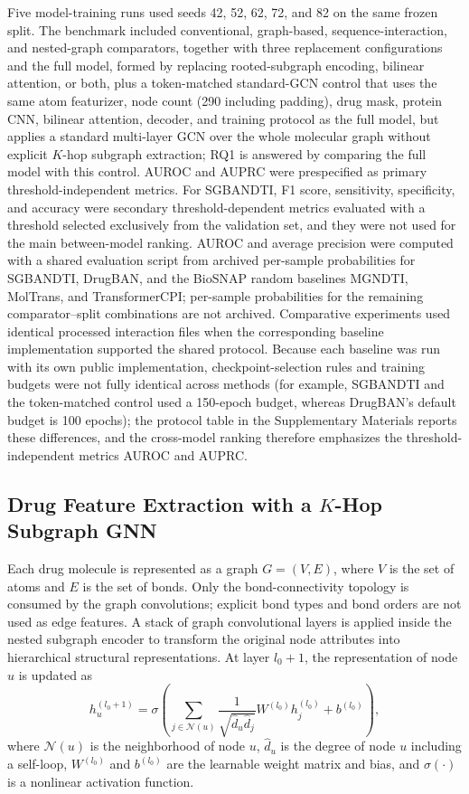 \documentclass[computers,article,submit,moreauthors]{Definitions/mdpi}
\begin{document}
Five model-training runs used seeds 42, 52, 62, 72, and 82 on the same frozen split. The benchmark included conventional, graph-based, sequence-interaction, and nested-graph comparators, together with three replacement configurations and the full model, formed by replacing rooted-subgraph encoding, bilinear attention, or both, plus a token-matched standard-GCN control that uses the same atom featurizer, node count (290 including padding), drug mask, protein CNN, bilinear attention, decoder, and training protocol as the full model, but applies a standard multi-layer GCN over the whole molecular graph without explicit $K$-hop subgraph extraction; RQ1 is answered by comparing the full model with this control. AUROC and AUPRC were prespecified as primary threshold-independent metrics. For SGBANDTI, F1 score, sensitivity, specificity, and accuracy were secondary threshold-dependent metrics evaluated with a threshold selected exclusively from the validation set, and they were not used for the main between-model ranking. AUROC and average precision were computed with a shared evaluation script from archived per-sample probabilities for SGBANDTI, DrugBAN, and the BioSNAP random baselines MGNDTI, MolTrans, and TransformerCPI; per-sample probabilities for the remaining comparator--split combinations are not archived. Comparative experiments used identical processed interaction files when the corresponding baseline implementation supported the shared protocol. Because each baseline was run with its own public implementation, checkpoint-selection rules and training budgets were not fully identical across methods (for example, SGBANDTI and the token-matched control used a 150-epoch budget, whereas DrugBAN's default budget is 100 epochs); the protocol table in the Supplementary Materials reports these differences, and the cross-model ranking therefore emphasizes the threshold-independent metrics AUROC and AUPRC.

\subsection{Drug Feature Extraction with a \texorpdfstring{$K$}{K}-Hop Subgraph GNN}
Each drug molecule is represented as a graph $G = (V, E)$, where $V$ is the set of atoms and $E$ is the set of bonds. Only the bond-connectivity topology is consumed by the graph convolutions; explicit bond types and bond orders are not used as edge features. A stack of graph convolutional layers is applied inside the nested subgraph encoder to transform the original node attributes into hierarchical structural representations. At layer $l_0 + 1$, the representation of node $u$ is updated as
\begin{equation}
h_u^{(l_0+1)} = \sigma \left( \sum_{j \in \mathcal{N}(u)} \frac{1}{\sqrt{\hat{d}_u \hat{d}_j}} W^{(l_0)} h_j^{(l_0)} + b^{(l_0)} \right),
\end{equation}
where $\mathcal{N}(u)$ is the neighborhood of node $u$, $\hat{d}_u$ is the degree of node $u$ including a self-loop, $W^{(l_0)}$ and $b^{(l_0)}$ are the learnable weight matrix and bias, and $\sigma(\cdot)$ is a nonlinear activation function.
\end{document}
